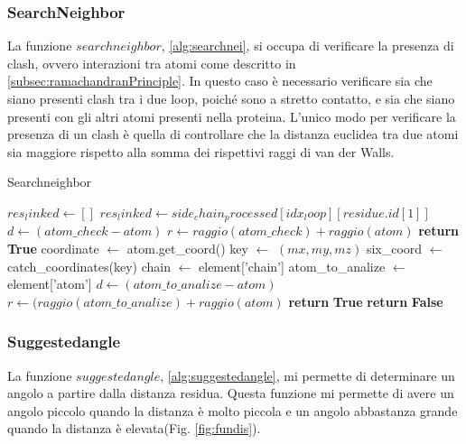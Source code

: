 \subsubsection{SearchNeighbor}\label{subsubsec:ricercavicini}
La funzione $searchneighbor$, \ref{alg:searchnei}, si occupa di verificare la presenza di clash, ovvero interazioni tra atomi come descritto in \ref{subsec:ramachandranPrinciple}. In questo caso è necessario verificare sia che siano presenti clash tra i due loop, poiché sono a stretto contatto, e sia che siano presenti con gli altri atomi presenti nella proteina. L'unico modo per verificare la presenza di un clash è quella di controllare che la distanza euclidea tra due atomi sia maggiore rispetto alla somma dei rispettivi raggi di van der Walls.  
\begin{algorithm}[H]
	\caption{Searchneighbor}
	\label{alg:searchnei}
	\begin{algorithmic}[1]
		\State $res_linked \gets []$
			\State $res_linked \gets side_chain_processed[idx_loop][residue.id[1]]$
		\EndIf
					\State $d \gets (atom\_check - atom)$
					\State $r \gets raggio(atom\_check)+raggio(atom)$
						\State \textbf{return} \textbf{True}
					\EndIf
				\EndFor
			\EndIf
			\State coordinate $\gets$ atom.get\_coord()
			\State key $\gets$ $(mx, my, mz)$
			\State six\_coord $\gets$ catch\_coordinates(key)
					\State chain $\gets$ element['chain']
					\State atom\_to\_analize $\gets$ element['atom']
						\State $d \gets (atom\_to\_analize - atom)$
						\State $r \gets (raggio(atom\_to\_analize)+raggio(atom)$
							\State \textbf{return} \textbf{True}
						\EndIf
					\EndIf
				\EndFor
			\EndFor
		\EndFor
		\State \textbf{return} \textbf{False}
		\EndProcedure
	\end{algorithmic}
\end{algorithm}
\subsubsection{Suggestedangle}\label{subsubsec:suggerimentoangoli}
La funzione $suggestedangle$, \ref{alg:suggestedangle}, mi permette di determinare un angolo a partire dalla distanza residua. Questa funzione mi permette di avere un angolo piccolo quando la distanza è molto piccola e un angolo abbastanza grande quando la distanza è elevata(Fig. \ref{fig:fundis}). 

